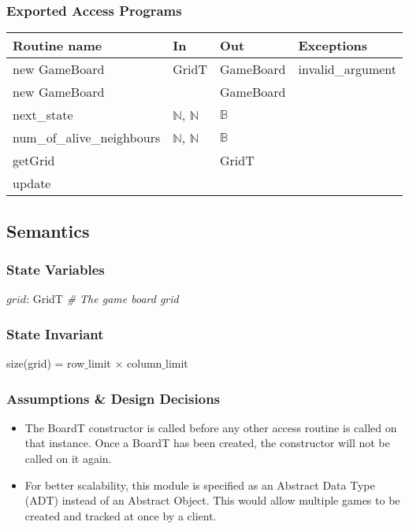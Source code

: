 \documentclass[12pt]{article}
\begin{document}
\subsubsection* {Exported Access Programs}

\begin{tabular}{| l | l | l | l |}
\hline
\textbf{Routine name} & \textbf{In} & \textbf{Out} & \textbf{Exceptions}\\
\hline
new GameBoard  & GridT & GameBoard & invalid\_argument\\
\hline
new GameBoard &  &  GameBoard & \\
\hline
next\_state & $\mathbb{N}$, $\mathbb{N}$  &  $\mathbb{B}$ & \\
\hline
num\_of\_alive\_neighbours & $\mathbb{N}$, $\mathbb{N}$  &  $\mathbb{B}$ & \\
\hline
getGrid &  & GridT & \\
\hline
update &  &  & \\
\hline
\end{tabular}

\subsection* {Semantics}

\subsubsection* {State Variables}

$grid$: GridT \textit{\# The game board grid}

\subsubsection* {State Invariant}

size(grid) = row$\_$limit $\times$ column$\_$limit


\subsubsection* {Assumptions \& Design Decisions}

\begin{itemize}

\item The BoardT constructor is called before any other access
  routine is called on that instance. Once a BoardT has been created, the
  constructor will not be called on it again.

\item For better scalability, this module is specified as an Abstract Data Type
  (ADT) instead of an Abstract Object. This would allow multiple games to be
  created and tracked at once by a client.

\end{itemize}
\end{document}
